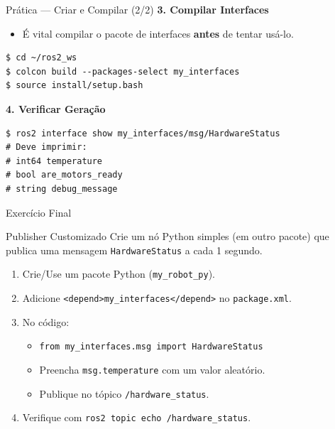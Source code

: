 \begin{frame}[fragile]{Prática — Criar e Compilar (2/2)}
  \textbf{3. Compilar Interfaces}
  \begin{itemize}
    \item É vital compilar o pacote de interfaces \textbf{antes} de tentar usá-lo.
  \end{itemize}
\begin{lstlisting}[style=bashstyle]
$ cd ~/ros2_ws
$ colcon build --packages-select my_interfaces
$ source install/setup.bash
\end{lstlisting}

  \textbf{4. Verificar Geração}
\begin{lstlisting}[style=bashstyle]
$ ros2 interface show my_interfaces/msg/HardwareStatus
# Deve imprimir:
# int64 temperature
# bool are_motors_ready
# string debug_message
\end{lstlisting}
\end{frame}

\begin{frame}[fragile]{Exercício Final}
  \begin{block}{Publisher Customizado}
    Crie um nó Python simples (em outro pacote) que publica uma mensagem \texttt{HardwareStatus} a cada 1 segundo.
  \end{block}
  \begin{enumerate}
    \item Crie/Use um pacote Python (\texttt{my\_robot\_py}).
    \item Adicione \texttt{<depend>my\_interfaces</depend>} no \texttt{package.xml}.
    \item No código:
      \begin{itemize}
        \item \texttt{from my\_interfaces.msg import HardwareStatus}
        \item Preencha \texttt{msg.temperature} com um valor aleatório.
        \item Publique no tópico \texttt{/hardware\_status}.
      \end{itemize}
    \item Verifique com \texttt{ros2 topic echo /hardware\_status}.
  \end{enumerate}
\end{frame}

